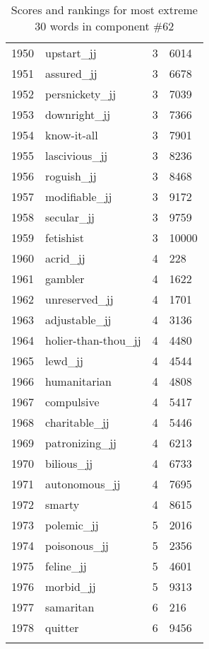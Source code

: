 \begin{longtable}[!htbp]{| rlr@{.}l |}
    1950 & upstart\_jj & 3 & 6014 \\
    1951 & assured\_jj & 3 & 6678 \\
    1952 & persnickety\_jj & 3 & 7039 \\
    1953 & downright\_jj & 3 & 7366 \\
    1954 & know-it-all & 3 & 7901 \\
    1955 & lascivious\_jj & 3 & 8236 \\
    1956 & roguish\_jj & 3 & 8468 \\
    1957 & modifiable\_jj & 3 & 9172 \\
    1958 & secular\_jj & 3 & 9759 \\
    1959 & fetishist & 3 & 10000 \\
    1960 & acrid\_jj & 4 & 228 \\
    1961 & gambler & 4 & 1622 \\
    1962 & unreserved\_jj & 4 & 1701 \\
    1963 & adjustable\_jj & 4 & 3136 \\
    1964 & holier-than-thou\_jj & 4 & 4480 \\
    1965 & lewd\_jj & 4 & 4544 \\
    1966 & humanitarian & 4 & 4808 \\
    1967 & compulsive & 4 & 5417 \\
    1968 & charitable\_jj & 4 & 5446 \\
    1969 & patronizing\_jj & 4 & 6213 \\
    1970 & bilious\_jj & 4 & 6733 \\
    1971 & autonomous\_jj & 4 & 7695 \\
    1972 & smarty & 4 & 8615 \\
    1973 & polemic\_jj & 5 & 2016 \\
    1974 & poisonous\_jj & 5 & 2356 \\
    1975 & feline\_jj & 5 & 4601 \\
    1976 & morbid\_jj & 5 & 9313 \\
    1977 & samaritan & 6 & 216 \\
    1978 & quitter & 6 & 9456 \\
    \hline
    \caption{Scores and rankings for most extreme 30 words in component \#62} \\
\end{longtable}
